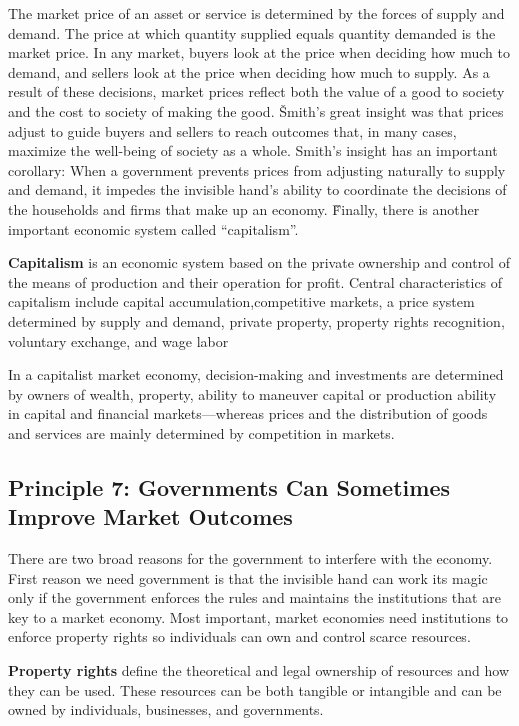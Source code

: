 The market price of an asset or service is determined by the forces of supply and demand. The price at which quantity
supplied equals quantity demanded is the market price. In any market, buyers look at the price when deciding how much
to demand, and sellers look at the price when deciding how much to supply. As a result of these decisions, market
prices reflect both the value of a good to society and the cost to society of making the good. \v

Smith's great insight was that prices adjust to guide buyers and sellers to reach outcomes that, in many cases,
maximize the well-being of society as a whole. Smith's insight has an important corollary: When a government prevents
prices from adjusting naturally to supply and demand, it impedes the invisible hand's ability to coordinate the
decisions of the households and firms that make up an economy. \v

Finally, there is another important economic system called ``capitalism''.

\bd[Capitalism]
\textbf{Capitalism} is an economic system based on the private ownership and control of the means of production and
their operation for profit. Central characteristics of capitalism include capital accumulation,competitive markets, a
price system determined by supply and demand, private property, property rights recognition, voluntary exchange, and
wage labor
\ed

In a capitalist market economy, decision-making and investments are determined by owners of wealth, property, ability
to maneuver capital or production ability in capital and financial markets—whereas prices and the distribution of
goods and services are mainly determined by competition in markets.

\subsection*{Principle 7: Governments Can Sometimes Improve Market Outcomes}

There are two broad reasons for the government to interfere with the economy. First reason we need government is that
the invisible hand can work its magic only if the government enforces the rules and maintains the institutions that
are key to a market economy. Most important, market economies need institutions to enforce property rights so
individuals can own and control scarce resources.

\textbf{Property rights} define the theoretical and legal ownership of resources and how they can be used. These
resources can be both tangible or intangible and can be owned by individuals, businesses, and governments.
\ed

